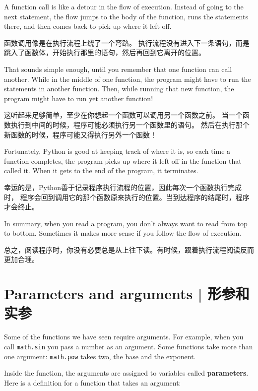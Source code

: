 A function call is like a detour in the flow of execution. Instead of
going to the next statement, the flow jumps to the body of
the function, runs the statements there, and then comes back
to pick up where it left off.

函数调用像是在执行流程上绕了一个弯路。
执行流程没有进入下一条语句，而是跳入了函数体，开始执行那里的语句，然后再回到它离开的位置。

That sounds simple enough, until you remember that one function can
call another.  While in the middle of one function, the program might
have to run the statements in another function.  Then, while
running that new function, the program might have to run yet
another function!

这听起来足够简单，至少在你想起一个函数可以调用另一个函数之前。
当一个函数执行到中间的时候，程序可能必须执行另一个函数里的语句。
然后在执行那个新函数的时候，程序可能又得执行另外一个函数！

Fortunately, Python is good at keeping track of where it is, so each
time a function completes, the program picks up where it left off in
the function that called it.  When it gets to the end of the program,
it terminates.

幸运的是，Python善于记录程序执行流程的位置，因此每次一个函数执行完成时，
程序会回到调用它的那个函数原来执行的位置。当到达程序的结尾时，程序才会终止。

In summary, when you read a program, you
don't always want to read from top to bottom.  Sometimes it makes
more sense if you follow the flow of execution.

总之，阅读程序时，你没有必要总是从上往下读。有时候，跟着执行流程阅读反而更加合理。


%
\section{Parameters and arguments  |  形参和实参}
\label{parameters}
    

Some of the functions we have seen require arguments.  For
example, when you call {\tt math.sin} you pass a number
as an argument.  Some functions take more than one argument:
{\tt math.pow} takes two, the base and the exponent.

Inside the function, the arguments are assigned to
variables called {\bf parameters}.  Here is a definition for
a function that takes an argument:

